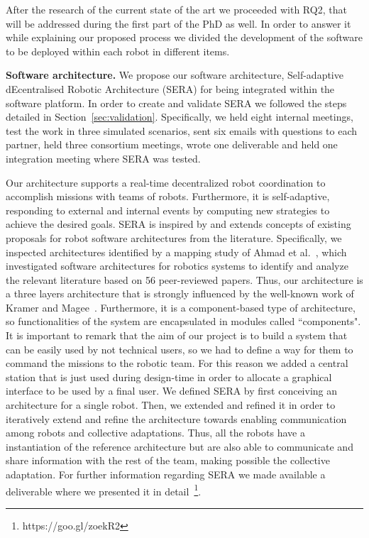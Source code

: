 After the research of the current state of the art we proceeded with RQ2, that will be addressed during the first part of the PhD as well.
In order to answer it while explaining our proposed process we divided the development of the software to be deployed within each robot in different items.

\textbf{Software architecture.}
We propose our software architecture, Self-adaptive dEcentralised Robotic Architecture (SERA) for being integrated within the software platform.
In order to create and validate SERA we followed the steps detailed in Section~\ref{sec:validation}.
Specifically, we held eight internal meetings, test the work in three simulated scenarios, sent six emails with questions to each partner, held three consortium meetings, wrote one deliverable and held one integration meeting where SERA was tested.

Our architecture supports a real-time decentralized robot coordination to accomplish missions with teams of robots. 
Furthermore, it is self-adaptive, responding to external and internal events by computing new strategies to achieve the desired goals.
SERA is inspired by and extends concepts of existing proposals for robot software architectures from the literature. 
Specifically, we inspected architectures identified by a mapping study of Ahmad et al.~\cite{Ahmad201616}, which investigated software architectures for robotics systems to identify and analyze the relevant literature based on 56 peer-reviewed papers.
Thus, our architecture is a three layers architecture that is strongly influenced by the well-known work of Kramer and Magee~\cite{kramer}.
Furthermore, it is a component-based type of architecture, so functionalities of the system are encapsulated in modules called ``components".
It is important to remark that the aim of our project is to build a system that can be easily used by not technical users, so we had to define a way for them to command the missions to the robotic team.
For this reason we added a central station that is just used during design-time in order to allocate a graphical interface to be used by a final user.
We defined SERA by first conceiving an architecture for a single robot. 
Then, we extended and refined it in order to iteratively extend and refine the architecture towards enabling communication among robots and collective adaptations. 
Thus, all the robots have a instantiation of the reference architecture but are also able to communicate and share information with the rest of the team, making possible the collective adaptation. 
For further information regarding SERA we made available a deliverable where we presented it in detail~\footnote{https://goo.gl/zoekR2}.

